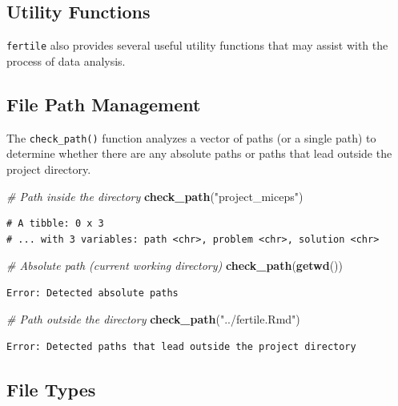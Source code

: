 \documentclass[12pt,twoside]{reedthesis}
\newenvironment{Shaded}{\begin{snugshade}}{\end{snugshade}}
\newcommand{\KeywordTok}[1]{\textcolor[rgb]{0.13,0.29,0.53}{\textbf{#1}}}
\newcommand{\StringTok}[1]{\textcolor[rgb]{0.31,0.60,0.02}{#1}}
\newcommand{\CommentTok}[1]{\textcolor[rgb]{0.56,0.35,0.01}{\textit{#1}}}
\newcommand{\NormalTok}[1]{#1}
\begin{document}
\subsection{Utility Functions}\label{utility-functions}

\texttt{fertile} also provides several useful utility functions that may
assist with the process of data analysis.

\subsection{File Path Management}\label{file-path-management}

The \texttt{check\_path()} function analyzes a vector of paths (or a
single path) to determine whether there are any absolute paths or paths
that lead outside the project directory.
\begin{Shaded}
\begin{Highlighting}[]
\CommentTok{# Path inside the directory}
\KeywordTok{check_path}\NormalTok{(}\StringTok{"project_miceps"}\NormalTok{)}
\end{Highlighting}
\end{Shaded}
\begin{verbatim}
# A tibble: 0 x 3
# ... with 3 variables: path <chr>, problem <chr>, solution <chr>
\end{verbatim}
\begin{Shaded}
\begin{Highlighting}[]
\CommentTok{# Absolute path (current working directory)}
\KeywordTok{check_path}\NormalTok{(}\KeywordTok{getwd}\NormalTok{())}
\end{Highlighting}
\end{Shaded}
\begin{verbatim}
Error: Detected absolute paths
\end{verbatim}
\begin{Shaded}
\begin{Highlighting}[]
\CommentTok{# Path outside the directory}
\KeywordTok{check_path}\NormalTok{(}\StringTok{"../fertile.Rmd"}\NormalTok{)}
\end{Highlighting}
\end{Shaded}
\begin{verbatim}
Error: Detected paths that lead outside the project directory
\end{verbatim}
\subsection{File Types}\label{file-types}
\end{document}

